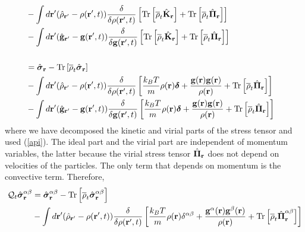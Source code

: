 \documentclass[b5paper,openright,11pt]{book}
\begin{document}
\begin{appendices}
\begin{align}
\nonumber\\
&-\int d{\bf r}'(\hat{\rho}_{{\bf r}'}-\rho({\bf r}',t))
\frac{\delta}{\delta \rho({\bf r}',t)}
\left[{\rm Tr}\left[\overline{\rho}_{t} \hat{\bf K}_{{\bf r}}\right]+{\rm Tr}\left[\overline{\rho}_{t} \hat{\boldsymbol{\Pi}}_{{\bf r}}\right]\right]
\nonumber\\
&-\int d{\bf r}'(\hat{\bf g}_{{\bf r}'}-{\bf g}({\bf r}',t))
\frac{\delta}{\delta {\bf g}({\bf r}',t)}
\left[{\rm Tr}\left[\overline{\rho}_{t} \hat{\bf K}_{{\bf r}}\right]+{\rm Tr}\left[\overline{\rho}_{t} \hat{\boldsymbol{\Pi}}_{{\bf r}}\right]\right]
\nonumber\\
\nonumber\\
&=\hat{\boldsymbol{\sigma}}_{{\bf r}}- {\rm Tr}\left[\overline{\rho}_{t} \hat{\boldsymbol{\sigma}}_{{\bf r}}\right]
\nonumber\\
&-\int d{\bf r}'(\hat{\rho}_{{\bf r}'}-\rho({\bf r}',t))
\frac{\delta}{\delta \rho({\bf r}',t)}
\left[
 \frac{k_BT}{m}\rho({\bf r})\boldsymbol{\delta}
+\frac{{\bf g}({\bf r}){\bf g}({\bf r})}{\rho({\bf r})}
+{\rm Tr}\left[\overline{\rho}_{t} \hat{\boldsymbol{\Pi}}_{{\bf r}}\right]\right]
\nonumber\\
&-\int d{\bf r}'(\hat{\bf g}_{{\bf r}'}-{\bf g}({\bf r}',t))
\frac{\delta}{\delta {\bf g}({\bf r}',t)}
\left[
 \frac{k_BT}{m}\rho({\bf r})\boldsymbol{\delta}
+\frac{{\bf g}({\bf r}){\bf g}({\bf r})}{\rho({\bf r})}
+{\rm Tr}\left[\overline{\rho}_{t} \hat{\boldsymbol{\Pi}}_{{\bf r}}\right]\right]
\label{QS}
\end{align}
where we  have decomposed the kinetic  and virial parts of  the stress
tensor and used  (\ref{api}).  The ideal part and the  virial part are
independent  of  momentum variables,  the  latter  because the  virial
stress  tensor $  \hat{\boldsymbol{\Pi}}_{\bf r}$  does not  depend on
velocities of the particles. The only term that depends on momentum is
the convective term. Therefore,
\begin{align}
  {\cal Q}_t\hat{\boldsymbol{\sigma}}^{\alpha\beta}_{{\bf r}}&=
\hat{\boldsymbol{\sigma}}^{\alpha\beta}_{{\bf r}}-{\rm Tr}\left[\overline{\rho}_t\hat{\boldsymbol{\sigma}}^{\alpha\beta}_{{\bf r}}\right]
\nonumber\\
&-\int d{\bf r}'(\hat{\rho}_{{\bf r}'}-\rho({\bf r}',t))
\frac{\delta}{\delta \rho({\bf r}',t)}
\left[
 \frac{k_BT}{m}\rho({\bf r})\delta^{\alpha\beta}
+\frac{{\bf g}^\alpha({\bf r}){\bf g}^\beta({\bf r})}{\rho({\bf r})}
+{\rm Tr}\left[\overline{\rho}_{t} \hat{\boldsymbol{\Pi}}^{\alpha\beta}_{{\bf r}}\right]\right]
\nonumber\\

\end{align}
\end{appendices}
\end{document}
